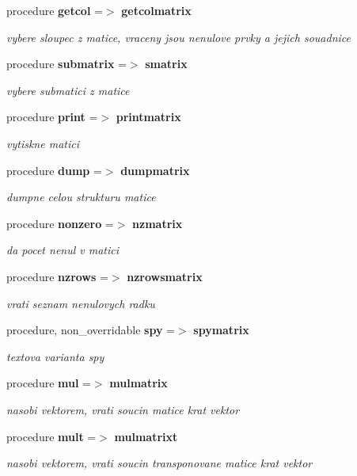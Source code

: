 \begin{DoxyCompactItemize}
procedure {\bf getcol} =$>$ {\bf getcolmatrix}
\begin{DoxyCompactList}\small\item\em vybere sloupec z matice, vraceny jsou nenulove prvky a jejich souadnice \end{DoxyCompactList}\item 
procedure {\bf submatrix} =$>$ {\bf smatrix}
\begin{DoxyCompactList}\small\item\em vybere submatici z matice \end{DoxyCompactList}\item 
procedure {\bf print} =$>$ {\bf printmatrix}
\begin{DoxyCompactList}\small\item\em vytiskne matici \end{DoxyCompactList}\item 
procedure {\bf dump} =$>$ {\bf dumpmatrix}
\begin{DoxyCompactList}\small\item\em dumpne celou strukturu matice \end{DoxyCompactList}\item 
procedure {\bf nonzero} =$>$ {\bf nzmatrix}
\begin{DoxyCompactList}\small\item\em da pocet nenul v matici \end{DoxyCompactList}\item 
procedure {\bf nzrows} =$>$ {\bf nzrowsmatrix}
\begin{DoxyCompactList}\small\item\em vrati seznam nenulovych radku \end{DoxyCompactList}\item 
procedure, non\+\_\+overridable {\bf spy} =$>$ {\bf spymatrix}
\begin{DoxyCompactList}\small\item\em textova varianta spy \end{DoxyCompactList}\item 
procedure {\bf mul} =$>$ {\bf mulmatrix}
\begin{DoxyCompactList}\small\item\em nasobi vektorem, vrati soucin matice krat vektor \end{DoxyCompactList}\item 
procedure {\bf mult} =$>$ {\bf mulmatrixt}
\begin{DoxyCompactList}\small\item\em nasobi vektorem, vrati soucin transponovane matice krat vektor \end{DoxyCompactList}\item 

\end{DoxyCompactItemize}
